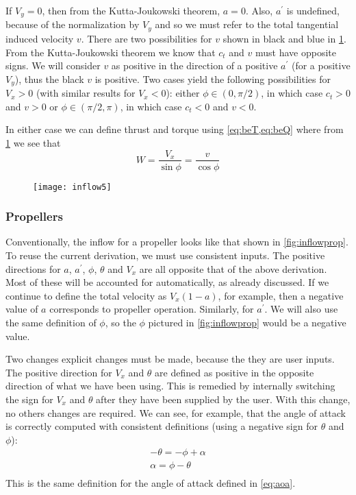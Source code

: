 If $V_y = 0$, then from the Kutta-Joukowski theorem, $a = 0$.  Also, $a^\prime$ is undefined, because of the normalization by $V_y$ and so we must refer to the total tangential induced velocity $v$.  There are two possibilities for $v$ shown in black and blue in \cref{fig:inflowv}.  From the Kutta-Joukowski theorem we know that $c_t$ and $v$ must have opposite signs.  We will consider $v$ as positive in the direction of a positive $a^\prime$ (for a positive $V_y$), thus the black $v$ is positive.  Two cases yield the following possibilities for $V_x > 0$ (with similar results for $V_x < 0$): either $\phi \in (0, \pi/2)$, in which case $c_t > 0$ and $v > 0$ or $\phi \in (\pi/2, \pi)$, in which case $c_t < 0$ and $v < 0$.

In either case we can define thrust and torque using \cref{eq:beT,eq:beQ} where from \cref{fig:inflowv} we see that
\begin{equation}
    W = \frac{V_x}{\sin\phi} = \frac{v}{\cos\phi}
\end{equation}


\begin{figure}[htbp]
\centering
\texttt{[image: inflow5]}
\caption{}
\label{fig:inflowv}
\end{figure}

\subsubsection{Propellers}

Conventionally, the inflow for a propeller looks like that shown in \cref{fig:inflowprop}.  To reuse the current derivation, we must use consistent inputs.  The positive directions for $a$, $a^\prime$, $\phi$, $\theta$ and $V_x$ are all opposite that of the above derivation.  Most of these will be accounted for automatically, as already discussed.  If we continue to define the total velocity as $V_x (1 - a)$, for example, then a negative value of $a$ corresponds to propeller operation.  Similarly, for $a^\prime$.  We will also use the same definition of $\phi$, so the $\phi$ pictured in \cref{fig:inflowprop} would be a negative value.

Two changes explicit changes must be made, because the they are user inputs.   The positive direction for $V_x$ and $\theta$ are defined as positive in the opposite direction of what we have been using.  This is remedied by internally switching the sign for $V_x$ and $\theta$ after they have been supplied by the user.  With this change, no others changes are required.  We can see, for example, that the angle of attack is correctly computed with consistent definitions (using a negative sign for $\theta$ and $\phi$):
\begin{equation}
    \begin{aligned}
        -\theta = -\phi + \alpha\\
        \alpha = \phi - \theta\\
    \end{aligned}
\end{equation}
This is the same definition for the angle of attack defined in \cref{eq:aoa}.

